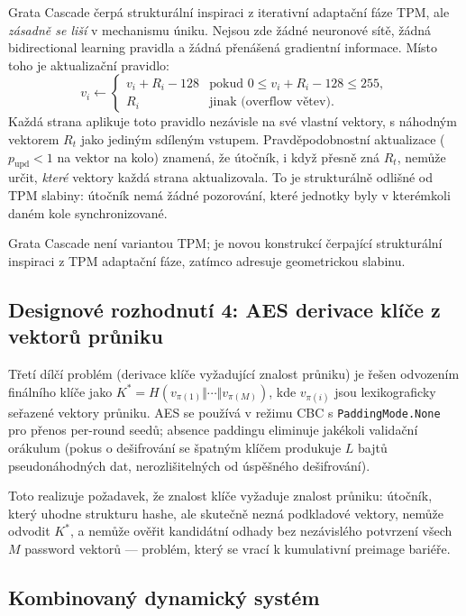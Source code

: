 \documentclass[11pt,a4paper]{article}
\begin{document}
Grata Cascade čerpá strukturální inspiraci z iterativní adaptační fáze TPM, ale \emph{zásadně se liší} v mechanismu úniku. Nejsou zde žádné neuronové sítě, žádná bidirectional learning pravidla a žádná přenášená gradientní informace. Místo toho je aktualizační pravidlo:
\[
v_i \gets \begin{cases} v_i + R_i - 128 & \text{pokud } 0 \leq v_i + R_i - 128 \leq 255, \\ R_i & \text{jinak (overflow větev)}. \end{cases}
\]
Každá strana aplikuje toto pravidlo nezávisle na své vlastní vektory, s náhodným vektorem $R_t$ jako jediným sdíleným vstupem. Pravděpodobnostní aktualizace ($p_\text{upd} < 1$ na vektor na kolo) znamená, že útočník, i když přesně zná $R_t$, nemůže určit, \emph{které} vektory každá strana aktualizovala. To je strukturálně odlišné od TPM slabiny: útočník nemá žádné pozorování, které jednotky byly v kterémkoli daném kole synchronizované.

Grata Cascade není variantou TPM; je novou konstrukcí čerpající strukturální inspiraci z TPM adaptační fáze, zatímco adresuje geometrickou slabinu.

\subsection{Designové rozhodnutí 4: AES derivace klíče z vektorů průniku}

Třetí dílčí problém (derivace klíče vyžadující znalost průniku) je řešen odvozením finálního klíče jako $K^* = H(v_{\pi(1)} \Vert \cdots \Vert v_{\pi(M)})$, kde $v_{\pi(i)}$ jsou lexikograficky seřazené vektory průniku. AES se používá v režimu CBC s \texttt{PaddingMode.None} pro přenos per-round seedů; absence paddingu eliminuje jakékoli validační orákulum (pokus o dešifrování se špatným klíčem produkuje $L$ bajtů pseudonáhodných dat, nerozlišitelných od úspěšného dešifrování).

Toto realizuje požadavek, že znalost klíče vyžaduje znalost průniku: útočník, který uhodne strukturu hashe, ale skutečně nezná podkladové vektory, nemůže odvodit $K^*$, a nemůže ověřit kandidátní odhady bez nezávislého potvrzení všech $M$ password vektorů --- problém, který se vrací k kumulativní preimage bariéře.

\subsection{Kombinovaný dynamický systém}
\end{document}

